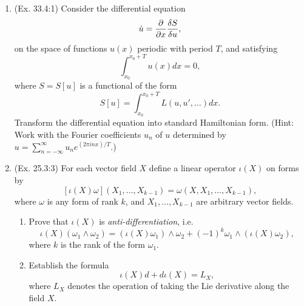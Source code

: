 \begin{enumerate}
\begin{proof}
\begin{enumerate}
			\item For $U(r) = \alpha r^2$, by a similar deduction, we can reduce the problem to the integral
			\begin{eqnarray}
				d\phi = \frac{-u du}{\sqrt{-u^4 + Au^2 -B}},
			\end{eqnarray}
			with $A = 2mE/|M|^2, B = 2m\alpha/|M|^2$. After a series of change of variable and substitution back, we then have
			\begin{eqnarray}
				\phi = \frac{1}{2} \arccos\left(\frac{2u^2 - A}{\sqrt{A^2 - 4B}}\right) + C
			\end{eqnarray}
			Set the boundary condition $\phi = \phi_0$ when $u^2 = (\sqrt{A^2 - 4B} + A)/2$, which leads to $C = \phi_0$. Therefore,
			\[ \phi - \phi_0 = \frac{1}{2} \arccos\left(\frac{2u^2/A - 1}{\sqrt{1 - 4B/A^2}}\right),\]
			or
			\begin{eqnarray}
				r^2 = \frac{|M|^2/mE}{1 + \sqrt{1 - |M|^2\alpha/2mE^2} \cos 2(\phi - \phi_0)}.
			\end{eqnarray}
			This as well represents a conic section in polar coordinate.  By the condition for an ellipse we can draw the same conclusion but in the region $E > 0, \alpha > 0$.
		\end{enumerate}
	\end{proof}
	
	\item (Ex. 33.4:1) Consider the differential equation \[ \dot{u} = \frac{ \partial  }{ \partial x } \frac{\delta S}{\delta u}, \] on the space of functions $u(x)$ periodic with period $T$, and satisfying \[ \int_{x_0}^{x_0+T} u(x) dx = 0, \] where $S = S[u]$ is a functional of the form \[ S[u] = \int_{x_0}^{x_0+T} L(u, u', \dots) dx. \] Transform the differential equation into standard Hamiltonian form. (Hint: Work with the Fourier coefficients $u_n$ of $u$ determined by $u = \sum_{n = -\infty}^{\infty} u_n e^{(2 \pi i n x)/T} $.)
	
	\item (Ex. 25.3:3) For each vector field $X$ define a linear operator $\iota(X)$ on forms by
	\[ [\iota(X)\omega](X_1, \dots, X_{k-1}) = \omega(X, X_1, \dots, X_{k-1}), \] where $\omega$ is any form of rank $k$, and $X_1, \dots, X_{k-1}$ are arbitrary vector fields.
	\begin{enumerate}
		\item Prove that $\iota(X)$ is \emph{anti-differentiation}, i.e.
		\[ \iota(X)(\omega_1 \wedge \omega_2) = (\iota(X)\omega_1) \wedge \omega_2 + (-1)^k \omega_1 \wedge (\iota(X)\omega_2), \]
		where $k$ is the rank of the form $\omega_1$.
		\item Establish the formula \[ \iota(X)d + d \iota(X) = L_X, \] where $L_X$ denotes the operation of taking the Lie derivative along the field $X$.
	\end{enumerate}
\end{enumerate}

